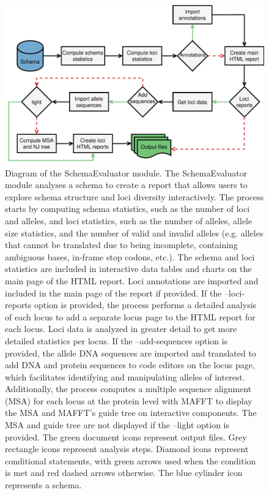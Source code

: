 \newpage
\begin{figure}[h!]
    \centering
    \includegraphics[angle=0,width=\textwidth]{figures/chapter 2/FigureS20.pdf}
    \caption{Diagram of the SchemaEvaluator module. The SchemaEvaluator module analyses a schema to create a report that allows users to explore schema structure and loci diversity interactively. The process starts by computing schema statistics, such as the number of loci and alleles, and loci statistics, such as the number of alleles, allele size statistics, and the number of valid and invalid alleles (e.g. alleles that cannot be translated due to being incomplete, containing ambiguous bases, in-frame stop codons, etc.). The schema and loci statistics are included in interactive data tables and charts on the main page of the HTML report. Loci annotations are imported and included in the main page of the report if provided. If the --loci-reports option is provided, the process performs a detailed analysis of each locus to add a separate locus page to the HTML report for each locus. Loci data is analyzed in greater detail to get more detailed statistics per locus. If the --add-sequences option is provided, the allele DNA sequences are imported and translated to add DNA and protein sequences to code editors on the locus page, which facilitates identifying and manipulating alleles of interest. Additionally, the process computes a multiple sequence alignment (MSA) for each locus at the protein level with MAFFT to display the MSA and MAFFT's guide tree on interactive components. The MSA and guide tree are not displayed if the --light option is provided. The green document icons represent output files. Grey rectangle icons represent analysis steps. Diamond icons represent conditional statements, with green arrows used when the condition is met and red dashed arrows otherwise. The blue cylinder icon represents a schema.}
    \label{fig:chap2_figureS20}
\end{figure}

